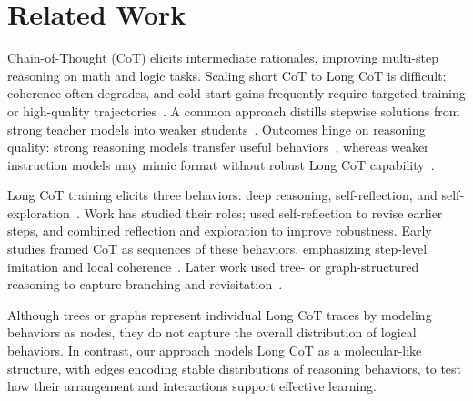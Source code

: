 \vspace{-1mm}\section{Related Work}\vspace{-1mm}
Chain-of-Thought (CoT) elicits intermediate rationales, improving multi-step reasoning on math and logic tasks. Scaling short CoT to Long CoT is difficult: coherence often degrades, and cold-start gains frequently require targeted training or high-quality trajectories~\citep{guo2025deepseek,moshkov2025aimo}. 
A common approach distills stepwise solutions from strong teacher models into weaker students~\citep{muennighoff2025s1,zhao20251}. 
Outcomes hinge on reasoning quality: strong reasoning models transfer useful behaviors~\citep{ye2025limo}, whereas weaker instruction models may mimic format without robust Long CoT capability~\citep{du2025the,chandra2025shape}.

Long CoT training elicits three behaviors: deep reasoning, self-reflection, and self-exploration~\citep{o1,guo2025deepseek,chen2025towards}. Work has studied their roles; \citet{madaan2023self} used self-reflection to revise earlier steps, and \citet{shinn2023reflexion} combined reflection and exploration to improve robustness. Early studies framed CoT as sequences of these behaviors, emphasizing step-level imitation and local coherence~\citep{wei2022chain,kojima2022large,chen2024unlocking}. Later work used tree- or graph-structured reasoning to capture branching and revisitation~\citep{yao2023tree,yao2024got,hu2024treeplanner,besta2024graph}.

Although trees or graphs represent individual Long CoT traces by modeling behaviors as nodes, they do not capture the overall distribution of logical behaviors. In contrast, our approach models Long CoT as a molecular-like structure, with edges encoding stable distributions of reasoning behaviors, to test how their arrangement and interactions support effective learning.

